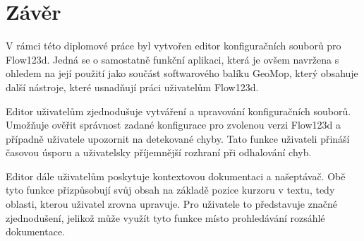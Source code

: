 \documentclass[FM,bw,DP]{tulthesis}
\begin{document}
%
%
%
%
%
%
%
%
%
%
%
%
%
%


\chapter*{Závěr}
V rámci této diplomové práce byl vytvořen editor konfiguračních souborů pro Flow123d. Jedná se o samostatně funkční aplikaci, která je ovšem navržena s ohledem na její použití jako součást softwarového balíku GeoMop, který obsahuje další nástroje, které usnadňují práci uživatelům Flow123d.

Editor uživatelům zjednodušuje vytváření a upravování konfiguračních souborů. Umožňuje ověřit správnost zadané konfigurace pro zvolenou verzi Flow123d a případně uživatele upozornit na detekované chyby. Tato funkce uživateli přináší časovou úsporu a uživatelsky příjemnější rozhraní při odhalování chyb.

Editor dále uživatelům poskytuje kontextovou dokumentaci a našeptávač. Obě tyto funkce přizpůsobují svůj obsah na základě pozice kurzoru v textu, tedy oblasti, kterou uživatel zrovna upravuje. Pro uživatele to představuje značné zjednodušení, jelikož může využít tyto funkce místo prohledávání rozsáhlé dokumentace.
\end{document}
